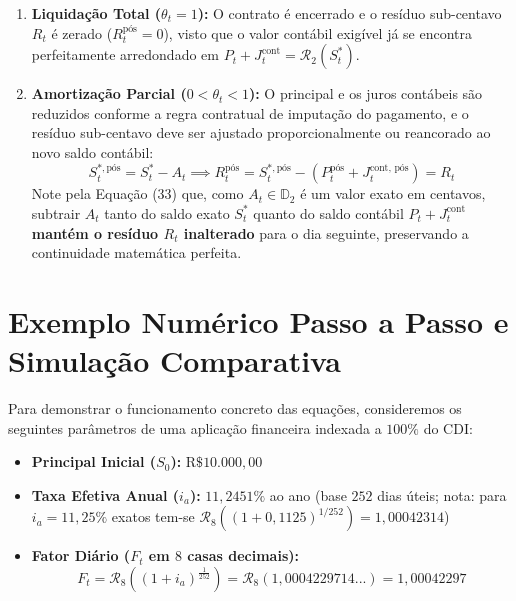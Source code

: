 \documentclass[11pt, a4paper]{article}
\begin{document}
\begin{enumerate}
    \item \textbf{Liquidação Total ($\theta_t = 1$):} O contrato é encerrado e o resíduo sub-centavo $R_t$ é zerado ($R_t^{\text{pós}} = 0$), visto que o valor contábil exigível já se encontra perfeitamente arredondado em $P_t + J_t^{\text{cont}} = \mathcal{R}_2(S_t^{*})$.
    \item \textbf{Amortização Parcial ($0 < \theta_t < 1$):} O principal e os juros contábeis são reduzidos conforme a regra contratual de imputação do pagamento, e o resíduo sub-centavo deve ser ajustado proporcionalmente ou reancorado ao novo saldo contábil:
    \begin{equation}
        S_t^{*,\text{pós}} = S_t^{*} - A_t \implies R_t^{\text{pós}} = S_t^{*,\text{pós}} - \left( P_t^{\text{pós}} + J_t^{\text{cont, pós}} \right) = R_t
    \end{equation}
    Note pela Equação (33) que, como $A_t \in \mathbb{D}_2$ é um valor exato em centavos, subtrair $A_t$ tanto do saldo exato $S_t^{*}$ quanto do saldo contábil $P_t + J_t^{\text{cont}}$ \textbf{mantém o resíduo $R_t$ inalterado} para o dia seguinte, preservando a continuidade matemática perfeita.
\end{enumerate}

\section{Exemplo Numérico Passo a Passo e Simulação Comparativa}

Para demonstrar o funcionamento concreto das equações, consideremos os seguintes parâmetros de uma aplicação financeira indexada a $100\%$ do CDI:
\begin{itemize}
    \item \textbf{Principal Inicial ($S_0$):} $\text{R\$ } 10.000{,}00$
    \item \textbf{Taxa Efetiva Anual ($i_a$):} $11{,}2451\%$ ao ano (base $252$ dias úteis; nota: para $i_a = 11{,}25\%$ exatos tem-se $\mathcal{R}_8((1+0{,}1125)^{1/252}) = 1{,}00042314$)
    \item \textbf{Fator Diário ($F_t$ em $8$ casas decimais):}
    \begin{equation}
        F_t = \mathcal{R}_8 \left( (1 + i_a)^{\frac{1}{252}} \right) = \mathcal{R}_8 \left( 1{,}0004229714... \right) = 1{,}00042297
    \end{equation}
\end{itemize}
\end{document}
